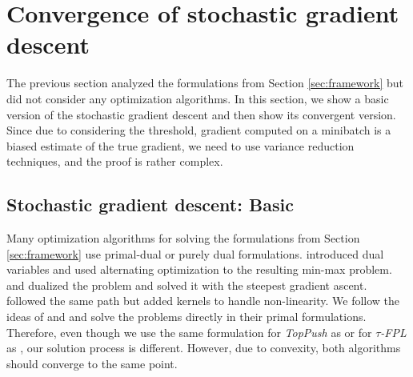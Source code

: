 \documentclass{Thesis}
\newcommand{\TopPush}{\emph{TopPush}\xspace}
\newcommand{\tauFPL}{{\emph{$\tau$-FPL}}\xspace}
\begin{document}
\section{Convergence of stochastic gradient descent}\label{sec:convergence}

The previous section analyzed the formulations from Section \ref{sec:framework} but did not consider any optimization algorithms. In this section, we show a basic version of the stochastic gradient descent and then show its convergent version. Since due to considering the threshold, gradient computed on a minibatch is a biased estimate of the true gradient, we need to use variance reduction techniques, and the proof is rather complex.

\subsection{Stochastic gradient descent: Basic}

Many optimization algorithms for solving the formulations from Section \ref{sec:framework} use primal-dual or purely dual formulations. \cite{Eban_2017} introduced dual variables and used alternating optimization to the resulting min-max problem.  \cite{Li_TopPush} and \cite{zhang2018tau} dualized the problem and solved it with the steepest gradient ascent. \cite{macha2020nonlinear} followed the same path but added kernels to handle non-linearity. We follow the ideas of \cite{mackey2018constrained} and \cite{adam2019machine} and solve the problems directly in their primal formulations. Therefore, even though we use the same formulation for \TopPush as \cite{Li_TopPush} or for \tauFPL as \cite{zhang2018tau}, our solution process is different. However, due to convexity, both algorithms should converge to the same point.
\end{document}
